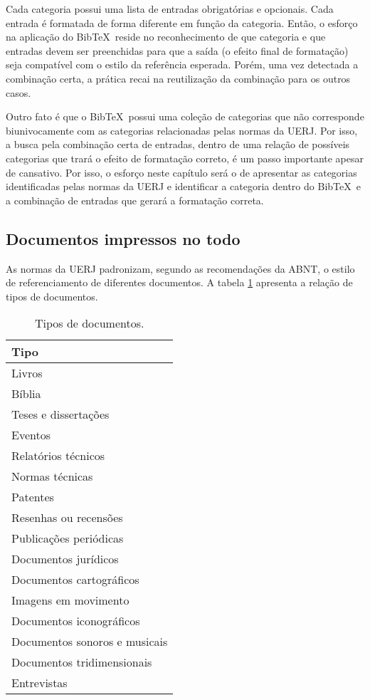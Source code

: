 \documentclass[a4paper,12pt,oneside,onecolumn]{uerj/uerj}
\newcommand{\BibTeX}{{{Bib}}\TeX}
\begin{document}
Cada categoria possui uma lista de entradas obrigatórias e opcionais. Cada entrada é formatada de forma diferente em função da categoria. Então, o esforço na aplicação do \BibTeX\ reside no reconhecimento de que categoria e que entradas devem ser preenchidas para que a saída (o efeito final de formatação) seja compatível com o estilo da referência esperada. Porém, uma vez detectada a combinação certa, a prática recai na reutilização da combinação para os outros casos.

Outro fato é que o \BibTeX\ possui uma coleção de categorias que não corresponde biunivocamente com as categorias relacionadas pelas normas da UERJ. Por isso, a busca pela combinação certa de entradas, dentro de uma relação de possíveis categorias que trará o efeito de formatação correto, é um passo importante apesar de cansativo. Por isso, o esforço neste capítulo será o de apresentar as categorias identificadas pelas normas da UERJ e identificar a categoria dentro do \BibTeX\ e a combinação de entradas que gerará a formatação correta.

\subsection{Documentos impressos no todo}

As normas da UERJ padronizam, segundo as recomendações da ABNT, o estilo de referenciamento de diferentes documentos. A tabela \ref{tab:tabela1} apresenta a relação de tipos de documentos.

\begin{table}[!ht]
  \caption{Tipos de documentos.}
  \center
  \begin{tabular}{l}
    \hline
    Tipo \\
    \hline
    Livros \\
    Bíblia \\
    Teses e dissertações \\
    Eventos \\
    Relatórios técnicos \\
    Normas técnicas \\
    Patentes \\
    Resenhas ou recensões \\
    Publicações periódicas \\
    Documentos jurídicos \\
    Documentos cartográficos \\
    Imagens em movimento \\
    Documentos iconográficos \\
    Documentos sonoros e musicais \\
    Documentos tridimensionais \\
    Entrevistas \\
    \hline
  \end{tabular}
  \label{tab:tabela1}
\end{table}
\end{document}
